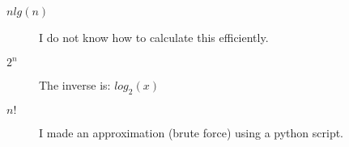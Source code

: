 \documentclass{article}
\begin{document}
  \begin{description}
    \item[$n lg(n)$] I do not know how to calculate this efficiently.
    \item[$2^n$] The inverse is: $log_{2}(x)$
    \item[$n!$] I made an approximation (brute force) using a python script. 
  \end{description}


%  
% 
\end{document}
